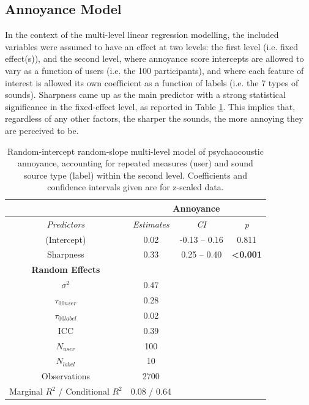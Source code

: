 \subsection{Annoyance Model}
In the context of the multi-level linear regression modelling, the included variables were assumed to have an effect at two levels: the first level (i.e. fixed effect(s)), and the second level, where annoyance score intercepts are allowed to vary as a function of users (i.e. the 100 participants), and where each feature of interest is allowed its own coefficient as a function of labels (i.e. the 7 types of sounds). Sharpness came up as the main predictor with a strong statistical significance in the fixed-effect level, as reported in Table \ref{tab:annoyance-model}. This implies that, regardless of any other factors, the sharper the sounds, the more annoying they are perceived to be.

\begin{table}[h]
  \centering
  \caption{Random-intercept random-slope multi-level model of psychaocoustic annoyance, accounting for repeated measures (user) and sound source type (label) within the second level. Coefficients and confidence intervals given are for z-scaled data.}
  \label{tab:annoyance-model}
  \begin{tabular}{cccc} 
  \toprule
   & \multicolumn{3}{c}{\textbf{Annoyance }} \\ 
  \hline
  \textit{Predictors} & \textit{Estimates} & \textit{CI} & \textit{p} \\ 
  \hline
  (Intercept) & 0.02 & -0.13 -- 0.16 & 0.811 \\
  Sharpness & 0.33 & 0.25 -- 0.40 & \textbf{\textless{}0.001} \\ 
  \hline
  \textbf{Random Effects} &  &  &  \\ 
  \hline
  $\sigma^2$ & 0.47 &  &  \\
  $\tau_{00user}$ & 0.28 &  &  \\
  $\tau_{00label}$ & 0.02 &  &  \\
  ICC & 0.39 &  &  \\
  $N_{user}$ & 100 &  &  \\
  $N_{label}$ & 10 &  &  \\ 
  \hline
  Observations & 2700 &  &  \\
  Marginal $R^2$ / Conditional $R^2$ & 0.08 / 0.64 &  &  \\
  \bottomrule
  \end{tabular}
  \end{table}

